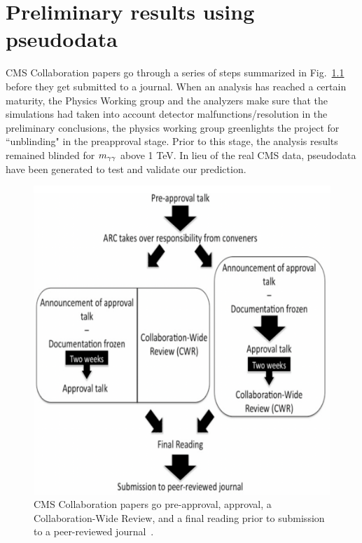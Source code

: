 \chapter{Preliminary results using pseudodata}\label{ch:appendix_pseudodata}

CMS Collaboration papers go through a series of steps summarized in Fig.~\ref{Fig:CMSPubJourney} before they get submitted to a journal. 
When an analysis has reached a certain maturity, the Physics Working group and the analyzers make sure that the simulations had taken into account detector malfunctions/resolution in the preliminary conclusions, the physics working group greenlights the project for ``unblinding" in the preapproval stage. Prior to this stage, the analysis results remained blinded for $m_{\gamma\gamma}$ above 1 TeV. In lieu of the real CMS data, pseudodata have been generated to test and validate our prediction. 

\begin{figure}[h!]\centering
\includegraphics[scale=0.7]{fig/CMSPublication.png}
\caption{CMS Collaboration papers go pre-approval, approval, a Collaboration-Wide Review, and a final reading prior to submission to a peer-reviewed journal~\cite{CMSPublishing}.}
\label{Fig:CMSPubJourney}
\end{figure}


